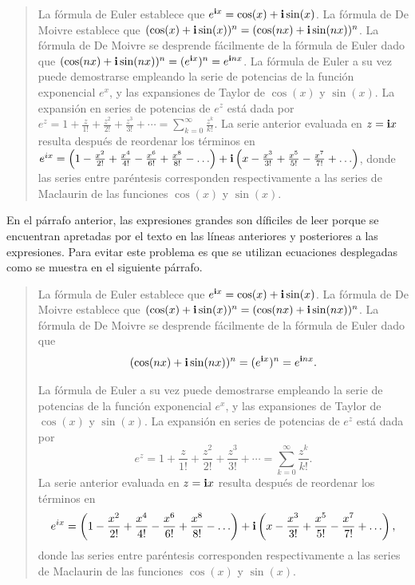 \documentclass[11pt,letterpaper,twoside]{report}%
\begin{document}
\begin{quote}
La fórmula de Euler establece que $e^{\mathbf{i} x} =\cos(x)+\mathbf{i}\sin(x)$.  La fórmula de De Moivre establece que $(\cos(x)+\mathbf{i}\sin(x))^n = (\cos(nx)+\mathbf{i}\sin(nx))^n$.  La fórmula de De Moivre se desprende fácilmente de la fórmula de Euler dado que $(\cos(nx)+\mathbf{i}\sin(nx))^n=(e^{\mathbf{i} x})^n=e^{\mathbf{i} nx}$. La fórmula de Euler a su vez puede demostrarse empleando la serie de potencias de la función exponencial $e^x$, y las expansiones de Taylor de $\cos(x)$ y $\sin(x)$.  La expansión en series de potencias de $e^z$ está dada por $e^z = 1 + \frac{z}{1!} + \frac{z^2}{2!} + \frac{z^3}{3!} + \cdots = \sum_{k=0}^\infty \frac{z^k}{k!}$.  La serie anterior evaluada en $z=\mathbf{i} x$ resulta después de reordenar los términos en 
$e^{ix} = \left ( 1 - \frac{x^2}{2!} + \frac{x^4}{4!} - \frac{x^6}{6!} + \frac{x^8}{8!} - \ldots \right )
        + \mathbf{i} \left ( x - \frac{x^3}{3!} + \frac{x^5}{5!} - \frac{x^7}{7!} + \ldots \right )$, donde las series entre paréntesis corresponden respectivamente a las series de Maclaurin de las funciones $\cos(x)$ y $\sin(x)$.
\end{quote}

En el párrafo anterior, las expresiones grandes son díficiles de leer porque se encuentran apretadas por el texto en las líneas anteriores y posteriores a las expresiones.  Para evitar este problema es que se utilizan ecuaciones desplegadas como se muestra en el siguiente párrafo.

\begin{quote}
La fórmula de Euler establece que $e^{\mathbf{i} x} =\cos(x)+\mathbf{i}\sin(x)$.  La fórmula de De Moivre establece que $(\cos(x)+\mathbf{i}\sin(x))^n = (\cos(nx)+\mathbf{i}\sin(nx))^n$.  La fórmula de De Moivre se desprende fácilmente de la fórmula de Euler dado que
$$ (\cos(nx)+\mathbf{i}\sin(nx))^n=(e^{\mathbf{i} x})^n=e^{\mathbf{i} nx}.$$

La fórmula de Euler a su vez puede demostrarse empleando la serie de potencias de la función exponencial $e^x$, y las expansiones de Taylor de $\cos(x)$ y $\sin(x)$.  La expansión en series de potencias de $e^z$ está dada por 
$$e^z = 1 + \frac{z}{1!} + \frac{z^2}{2!} + \frac{z^3}{3!} + \cdots = \sum_{k=0}^\infty \frac{z^k}{k!}.$$  La serie anterior evaluada en $z=\mathbf{i} x$ resulta después de reordenar los términos en 
$$e^{ix} = \left ( 1 - \frac{x^2}{2!} + \frac{x^4}{4!} - \frac{x^6}{6!} + \frac{x^8}{8!} - \ldots \right )
        + \mathbf{i} \left ( x - \frac{x^3}{3!} + \frac{x^5}{5!} - \frac{x^7}{7!} + \ldots \right ),$$ 
donde las series entre paréntesis corresponden respectivamente a las series de Maclaurin de las funciones $\cos(x)$ y $\sin(x)$.
\end{quote}
\end{document}
